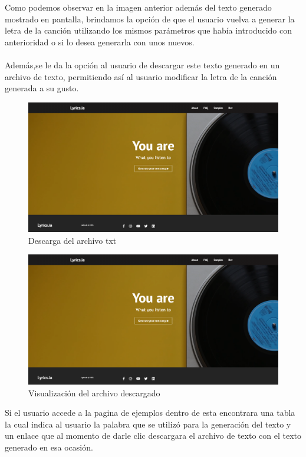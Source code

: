 \documentclass[12pt, a4paper, titlepage]{article}
\begin{document}
	Como podemos observar en la imagen anterior además del texto generado mostrado en pantalla, brindamos la opción de que el usuario vuelva a generar la letra de la canción utilizando los mismos parámetros que había introducido con anterioridad o si lo desea generarla con unos nuevos.\\\\ 
	Además,se le da la opción al usuario de descargar este texto generado en un archivo de texto, permitiendo así al usuario modificar la letra de la canción generada a su gusto.	
	\begin{figure}[H] 
		\includegraphics[width=13.5cm]{./Imagenes/Capturas/x.png}
		\centering \caption{Descarga del archivo txt}
	\end{figure}
	\begin{figure}[H] 
	\includegraphics[width=13.5cm]{./Imagenes/Capturas/x.png}
	\centering \caption{Visualización del archivo descargado}
	\end{figure}
	Si el usuario accede a la pagina de ejemplos dentro de esta encontrara una tabla la cual indica al usuario la palabra que se utilizó para la generación del texto y un enlace que al momento de darle clic descargara el archivo de texto con el texto generado en esa ocasión.
\end{document}
